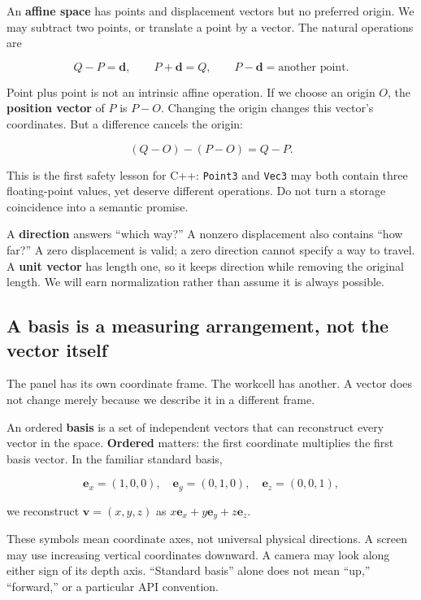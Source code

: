 An \textbf{affine space} has points and displacement vectors but no preferred origin. We may subtract two points, or translate a point by a vector. The natural operations are

\[
Q-P=\mathbf d,\qquad P+\mathbf d=Q,\qquad P-\mathbf d=\text{another point}.
\]

Point plus point is not an intrinsic affine operation. If we choose an origin \(O\), the \textbf{position vector} of \(P\) is \(P-O\). Changing the origin changes this vector's coordinates. But a difference cancels the origin:

\[
(Q-O)-(P-O)=Q-P.
\]

This is the first safety lesson for C++: \texttt{Point3} and \texttt{Vec3} may both contain three floating-point values, yet deserve different operations. Do not turn a storage coincidence into a semantic promise.

A \textbf{direction} answers ``which way?'' A nonzero displacement also contains ``how far?'' A zero displacement is valid; a zero direction cannot specify a way to travel. A \textbf{unit vector} has length one, so it keeps direction while removing the original length. We will earn normalization rather than assume it is always possible.

\subsection{A basis is a measuring arrangement, not the vector itself}\label{a-basis-is-a-measuring-arrangement-not-the-vector-itself}

The panel has its own coordinate frame. The workcell has another. A vector does not change merely because we describe it in a different frame.

An ordered \textbf{basis} is a set of independent vectors that can reconstruct every vector in the space. \textbf{Ordered} matters: the first coordinate multiplies the first basis vector. In the familiar standard basis,

\[
\mathbf e_x=(1,0,0),\quad
\mathbf e_y=(0,1,0),\quad
\mathbf e_z=(0,0,1),
\]

we reconstruct \(\mathbf v=(x,y,z)\) as \(x\mathbf e_x+y\mathbf e_y+z\mathbf e_z\).

These symbols mean coordinate axes, not universal physical directions. A screen may use increasing vertical coordinates downward. A camera may look along either sign of its depth axis. ``Standard basis'' alone does not mean ``up,'' ``forward,'' or a particular API convention.


